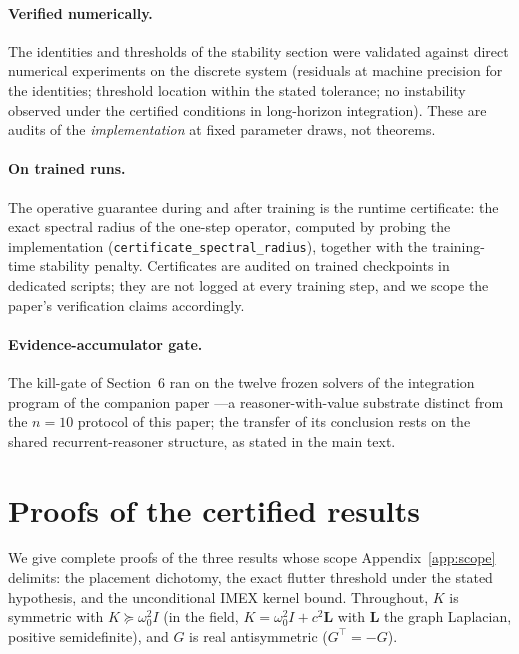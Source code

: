 \documentclass{article}
\newcommand{\compcite}{\citep{anon2026cognition}}
\newcommand{\compcite}{\citep{arrabal2026cognition}}
\begin{document}
{\paragraph{Verified numerically.} The identities and thresholds of the
stability section were validated against direct numerical experiments on
the discrete system (residuals at machine precision for the identities;
threshold location within the stated tolerance; no instability observed
under the certified conditions in long-horizon integration). These are
audits of the \emph{implementation} at fixed parameter draws, not
theorems.

\paragraph{On trained runs.} The operative guarantee during and after
training is the runtime certificate: the exact spectral radius of the
one-step operator, computed by probing the implementation
(\texttt{certificate\_spectral\_radius}), together with the training-time
stability penalty. Certificates are audited on trained checkpoints in
dedicated scripts; they are not logged at every training step, and we
scope the paper's verification claims accordingly.

\paragraph{Evidence-accumulator gate.} The kill-gate of
Section~6 ran on the twelve frozen solvers of the integration program of
the companion paper \compcite{}---a reasoner-with-value
substrate distinct from the
$n{=}10$ protocol of this paper; the transfer of its conclusion rests on
the shared recurrent-reasoner structure, as stated in the main text.


\section{Proofs of the certified results}\label{app:proofs}
We give complete proofs of the three results whose scope
Appendix~\ref{app:scope} delimits: the placement dichotomy, the exact
flutter threshold under the stated hypothesis, and the unconditional
IMEX kernel bound. Throughout, $K$ is symmetric with
$K\succeq\omega_0^2 I$ (in the field, $K=\omega_0^2 I + c^2\mathbf{L}$
with $\mathbf{L}$ the graph Laplacian, positive semidefinite), and $G$
is real antisymmetric ($G^\top=-G$).

}
\end{document}
